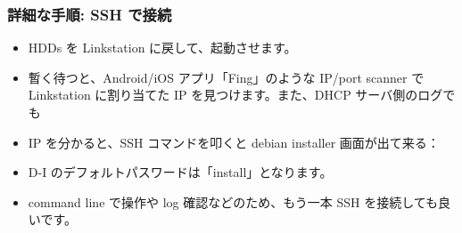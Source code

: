 \documentclass[mingoth,a4paper]{jsarticle}
\begin{document}
\subsubsection{詳細な手順: SSH で接続}
\begin{itemize}
\item HDDs を Linkstation に戻して、起動させます。
\item 暫く待つと、Android/iOS アプリ「Fing」のような IP/port scanner で Linkstation に割り当てた IP を見つけます。また、DHCP サーバ側のログでも
\item IP を分かると、SSH コマンドを叩くと debian installer 画面が出て来る：
\end{itemize}
\begin{itemize}
\item D-I のデフォルトパスワードは「install」となります。
\item command line で操作や log 確認などのため、もう一本 SSH を接続しても良いです。
\end{itemize}
\end{document}

